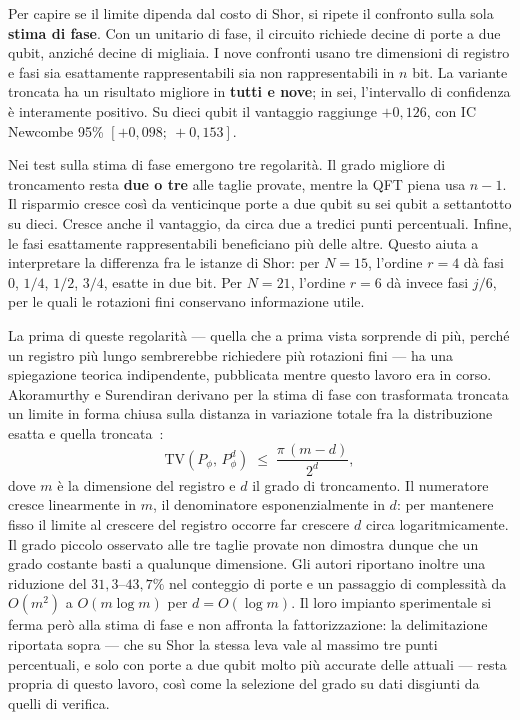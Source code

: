 \begin{onehalfspace}
Per capire se il limite dipenda dal costo di Shor, si ripete il confronto sulla sola \textbf{stima di fase}. Con un unitario di fase, il circuito richiede decine di porte a due qubit, anziché decine di migliaia. I nove confronti usano tre dimensioni di registro e fasi sia esattamente rappresentabili sia non rappresentabili in $n$ bit. La variante troncata ha un risultato migliore in \textbf{tutti e nove}; in sei, l'intervallo di confidenza è interamente positivo. Su dieci qubit il vantaggio raggiunge $+0{,}126$, con IC Newcombe 95\% $[+0{,}098;\ +0{,}153]$.

Nei test sulla stima di fase emergono tre regolarità. Il grado migliore di troncamento resta \textbf{due o tre} alle taglie provate, mentre la QFT piena usa $n-1$. Il risparmio cresce così da venticinque porte a due qubit su sei qubit a settantotto su dieci. Cresce anche il vantaggio, da circa due a tredici punti percentuali. Infine, le fasi esattamente rappresentabili beneficiano più delle altre. Questo aiuta a interpretare la differenza fra le istanze di Shor: per $N=15$, l'ordine $r=4$ dà fasi $0$, $1/4$, $1/2$, $3/4$, esatte in due bit. Per $N=21$, l'ordine $r=6$ dà invece fasi $j/6$, per le quali le rotazioni fini conservano informazione utile.

La prima di queste regolarità --- quella che a prima vista sorprende di più, perché un
registro più lungo sembrerebbe richiedere più rotazioni fini --- ha una spiegazione
teorica indipendente, pubblicata mentre questo lavoro era in corso. Akoramurthy e
Surendiran derivano per la stima di fase con trasformata troncata un limite in forma
chiusa sulla distanza in variazione totale fra la distribuzione esatta e quella
troncata~\cite{akoramurthy2026}:
%
\begin{equation}
\mathrm{TV}\!\left(P_\phi,\, P_\phi^{d}\right) \;\le\; \frac{\pi\,(m-d)}{2^{d}},
\label{eq:bound_troncamento}
\end{equation}
%
dove $m$ è la dimensione del registro e $d$ il grado di troncamento. Il numeratore cresce
linearmente in $m$, il denominatore esponenzialmente in $d$: per mantenere
fisso il limite al crescere del registro occorre far crescere $d$ circa
logaritmicamente. Il grado piccolo osservato alle tre taglie provate
non dimostra dunque che un grado costante basti a qualunque dimensione. Gli autori
riportano inoltre una riduzione del $31{,}3$--$43{,}7\%$ nel conteggio di porte e un
passaggio di complessità da $O(m^2)$ a $O(m \log m)$ per $d = O(\log m)$. Il loro impianto
sperimentale si ferma però alla stima di fase e non affronta la fattorizzazione: la
delimitazione riportata sopra --- che su Shor la stessa leva vale al massimo tre punti
percentuali, e solo con porte a due qubit molto più accurate delle attuali --- resta
propria di questo lavoro, così come la selezione del grado su dati disgiunti da quelli di
verifica.


\end{onehalfspace}
